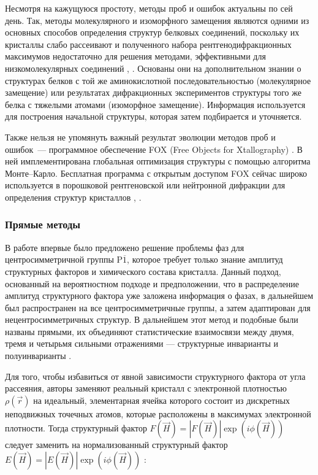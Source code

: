 Несмотря на кажущуюся простоту, методы проб и ошибок актуальны по сей день. Так, методы молекулярного и изоморфного замещения являются одними из основных способов определения структур белковых соединений, поскольку их кристаллы слабо рассеивают и полученного набора рентгенодифракционных максимумов недостаточно для решения методами, эффективными для низкомолекулярных соединений \cite{lattman_protein_2008-1}, \cite{margiolaki_powder_2008}. Основаны они на дополнительном знании о структурах белков с той же аминокислотной последовательностью (молекулярное замещение) или результатах дифракционных экспериментов структуры того же белка с тяжелыми атомами (изоморфное замещение). Информация используется для построения начальной структуры, которая затем подбирается и уточняется.

Также нельзя не упомянуть важный  результат эволюции методов проб и ошибок~--- программное обеспечение FOX (Free Objects for Xtallography) \cite{favre-nicolin_fox_2004}. В ней имплементирована глобальная оптимизация структуры с помощью алгоритма Монте--Карло. Бесплатная программа с открытым доступом FOX сейчас широко используется в порошковой рентгеновской или нейтронной дифракции для определения структур кристаллов \cite{cerny_fox_2005}, \cite{cerny_fox_2017}.

\subsubsection{Прямые методы}

В работе \cite{hauptman_solution_1954} впервые было предложено решение проблемы фаз для центросимметричной группы P$\overline{1}$, которое требует только знание амплитуд структурных факторов и химического состава кристалла. Данный подход, основанный на вероятностном подходе и предположении, что в распределение амплитуд структурного фактора уже заложена информация о фазах, в дальнейшем был распространен на все центросимметричные группы, а затем адаптирован для нецентросимметричных структур. В дальнейшем этот метод и подобные были названы прямыми, их объединяют статистические взаимосвязи между двумя, тремя и четырьмя сильными отражениями --- структурные инварианты и полуинварианты \cite{hauptman_direct_1986}. 

Для того, чтобы избавиться от явной зависимости структурного фактора от угла рассеяния, авторы заменяют реальный кристалл с электронной плотностью $\rho(\overrightarrow{r})$ на идеальный, элементарная ячейка которого состоит из дискретных неподвижных точечных атомов, которые расположены в максимумах электронной плотности. Тогда структурный фактор $F(\overrightarrow{H})=|F(\overrightarrow{H})|\exp(i\phi(\overrightarrow{H}))$ следует заменить на нормализованный структурный фактор $E(\overrightarrow{H}) = |E(\overrightarrow{H})|\exp(i\phi(\overrightarrow{H}))$ \cite{giacovazzo_direct_1998}:

